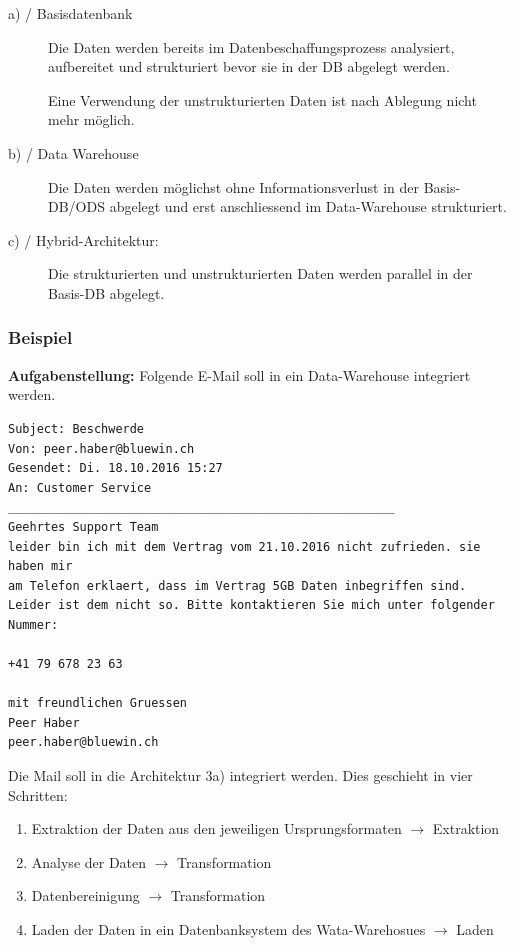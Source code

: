 \documentclass[a4paper, 11pt, nofootinbib]{article}
\begin{document}
\begin{description}
	\item[a) / Basisdatenbank] Die Daten werden bereits im Datenbeschaffungsprozess analysiert, aufbereitet und strukturiert bevor sie in der DB abgelegt werden. 
	
	Eine Verwendung der unstrukturierten Daten ist nach Ablegung nicht mehr möglich.
	\item[b) / Data Warehouse] Die Daten werden möglichst ohne Informationsverlust in der Basis-DB/ODS abgelegt und erst anschliessend im Data-Warehouse strukturiert.
	\item[c) / Hybrid-Architektur: ] Die strukturierten und unstrukturierten Daten werden parallel in der Basis-DB abgelegt.
\end{description}

\newpage

\subsubsection{Beispiel}
\textbf{Aufgabenstellung: } Folgende E-Mail soll in ein Data-Warehouse integriert werden.

\begin{lstlisting}
Subject: Beschwerde
Von: peer.haber@bluewin.ch
Gesendet: Di. 18.10.2016 15:27
An: Customer Service
______________________________________________________
Geehrtes Support Team
leider bin ich mit dem Vertrag vom 21.10.2016 nicht zufrieden. sie haben mir 
am Telefon erklaert, dass im Vertrag 5GB Daten inbegriffen sind. 
Leider ist dem nicht so. Bitte kontaktieren Sie mich unter folgender Nummer:

+41 79 678 23 63

mit freundlichen Gruessen
Peer Haber
peer.haber@bluewin.ch

\end{lstlisting}

Die Mail soll in die Architektur 3a) integriert werden. Dies geschieht in vier Schritten:

\begin{enumerate}
	\item Extraktion der Daten aus den jeweiligen Ursprungsformaten $\rightarrow$ Extraktion
	\item Analyse der Daten $\rightarrow$ Transformation
	\item Datenbereinigung $\rightarrow$ Transformation
	\item Laden der Daten in ein Datenbanksystem des Wata-Warehosues $\rightarrow$ Laden
\end{enumerate}
\end{document}
